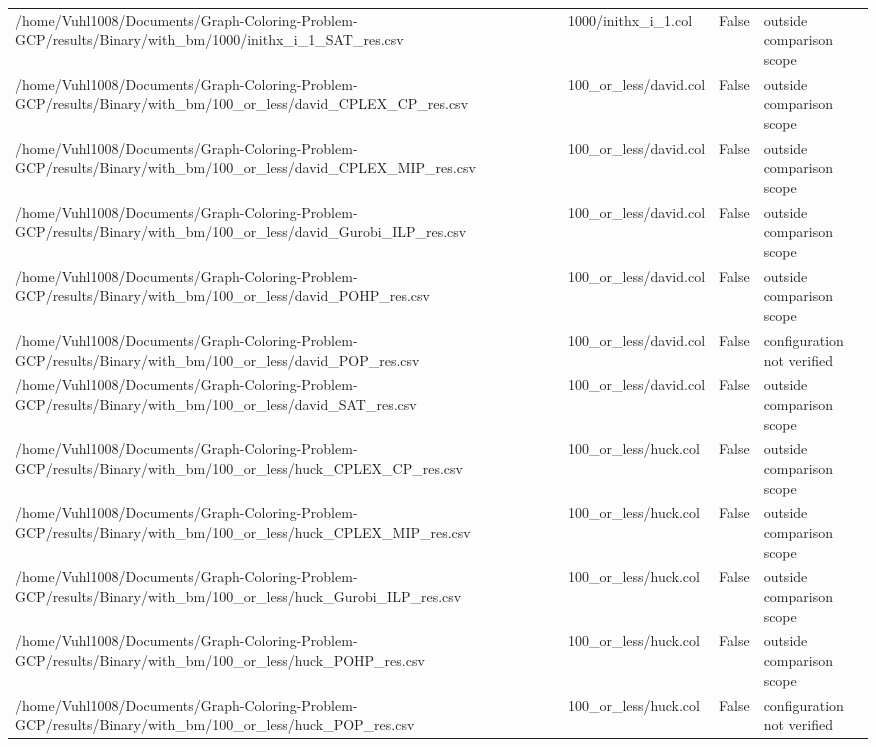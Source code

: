 \begin{table}[htbp]
\begin{tabular}{llll}
/home/Vuhl1008/Documents/Graph-Coloring-Problem-GCP/results/Binary/with\_bm/1000/inithx\_i\_1\_SAT\_res.csv & 1000/inithx\_i\_1.col & False & outside comparison scope \\
/home/Vuhl1008/Documents/Graph-Coloring-Problem-GCP/results/Binary/with\_bm/100\_or\_less/david\_CPLEX\_CP\_res.csv & 100\_or\_less/david.col & False & outside comparison scope \\
/home/Vuhl1008/Documents/Graph-Coloring-Problem-GCP/results/Binary/with\_bm/100\_or\_less/david\_CPLEX\_MIP\_res.csv & 100\_or\_less/david.col & False & outside comparison scope \\
/home/Vuhl1008/Documents/Graph-Coloring-Problem-GCP/results/Binary/with\_bm/100\_or\_less/david\_Gurobi\_ILP\_res.csv & 100\_or\_less/david.col & False & outside comparison scope \\
/home/Vuhl1008/Documents/Graph-Coloring-Problem-GCP/results/Binary/with\_bm/100\_or\_less/david\_POHP\_res.csv & 100\_or\_less/david.col & False & outside comparison scope \\
/home/Vuhl1008/Documents/Graph-Coloring-Problem-GCP/results/Binary/with\_bm/100\_or\_less/david\_POP\_res.csv & 100\_or\_less/david.col & False & configuration not verified \\
/home/Vuhl1008/Documents/Graph-Coloring-Problem-GCP/results/Binary/with\_bm/100\_or\_less/david\_SAT\_res.csv & 100\_or\_less/david.col & False & outside comparison scope \\
/home/Vuhl1008/Documents/Graph-Coloring-Problem-GCP/results/Binary/with\_bm/100\_or\_less/huck\_CPLEX\_CP\_res.csv & 100\_or\_less/huck.col & False & outside comparison scope \\
/home/Vuhl1008/Documents/Graph-Coloring-Problem-GCP/results/Binary/with\_bm/100\_or\_less/huck\_CPLEX\_MIP\_res.csv & 100\_or\_less/huck.col & False & outside comparison scope \\
/home/Vuhl1008/Documents/Graph-Coloring-Problem-GCP/results/Binary/with\_bm/100\_or\_less/huck\_Gurobi\_ILP\_res.csv & 100\_or\_less/huck.col & False & outside comparison scope \\
/home/Vuhl1008/Documents/Graph-Coloring-Problem-GCP/results/Binary/with\_bm/100\_or\_less/huck\_POHP\_res.csv & 100\_or\_less/huck.col & False & outside comparison scope \\
/home/Vuhl1008/Documents/Graph-Coloring-Problem-GCP/results/Binary/with\_bm/100\_or\_less/huck\_POP\_res.csv & 100\_or\_less/huck.col & False & configuration not verified \\

\end{tabular}
\end{table}
